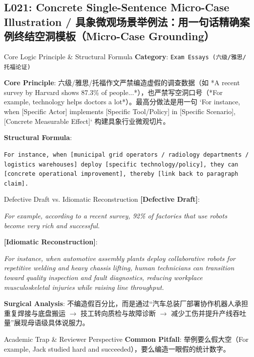 \subsection{L021: Concrete Single-Sentence Micro-Case Illustration / 具象微观场景举例法：用一句话精确案例终结空洞模板（Micro-Case Grounding）}\label{sec:logic:L021}
\begin{ConceptBox}{Core Logic Principle \& Structural Formula}
\textbf{Category}: \texttt{Exam Essays (六级/雅思/托福论证)}\par\vspace{3pt}
\textbf{Core Principle}: 六级/雅思/托福作文严禁编造虚假的调查数据（如 *A recent survey by Harvard shows 87.3\% of people...*），也严禁写空洞口号（*For example, technology helps doctors a lot*）。最高分做法是用一句 `For instance, when [Specific Actor] implements [Specific Tool/Policy] in [Specific Scenario], [Concrete Measurable Effect]` 构建具象行业微观切片。\par\vspace{4pt}
\textbf{Structural Formula}:\par\noindent\texttt{For instance, when [municipal grid operators / radiology departments / logistics warehouses] deploy [specific technology/policy], they can [concrete operational improvement], thereby [link back to paragraph claim].}
\end{ConceptBox}
\begin{ExampleBox}{Defective Draft vs. Idiomatic Reconstruction}
\textbf{\color{TargetHighlight}[Defective Draft]}:\par\textit{For example, according to a recent survey, 92\% of factories that use robots become very rich and successful.}\par\vspace{4pt}
\textbf{\color{AcadNavy}[Idiomatic Reconstruction]}:\par\textit{For instance, when automotive assembly plants deploy collaborative robots for repetitive welding and heavy chassis lifting, human technicians can transition toward quality inspection and fault diagnostics, reducing workplace musculoskeletal injuries while raising line throughput.}\par\vspace{4pt}
\textbf{Surgical Analysis}: 不编造假百分比，而是通过“汽车总装厂部署协作机器人承担重复焊接与底盘搬运 $\to$ 技工转向质检与故障诊断 $\to$ 减少工伤并提升产线吞吐量”展现母语级具体说服力。
\end{ExampleBox}
\begin{TipBox}{Academic Trap \& Reviewer Perspective}
\textbf{Common Pitfall}: 举例要么假大空（For example, Jack studied hard and succeeded），要么编造一眼假的统计数字。
\end{TipBox}
\vspace{6pt}
